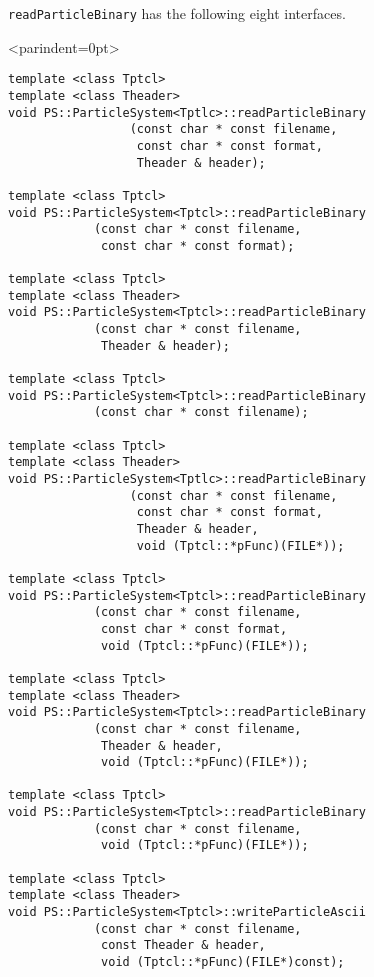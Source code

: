 \texttt{readParticleBinary} has the following eight interfaces.
\begin{breakitembox}<parindent=0pt>{}
\begin{verbatim}
template <class Tptcl>
template <class Theader>
void PS::ParticleSystem<Tptlc>::readParticleBinary
                 (const char * const filename,
                  const char * const format,
                  Theader & header);

template <class Tptcl>
void PS::ParticleSystem<Tptcl>::readParticleBinary
            (const char * const filename,
             const char * const format); 
             
template <class Tptcl>
template <class Theader>
void PS::ParticleSystem<Tptcl>::readParticleBinary
            (const char * const filename,
             Theader & header);

template <class Tptcl>
void PS::ParticleSystem<Tptcl>::readParticleBinary
            (const char * const filename);

template <class Tptcl>
template <class Theader>
void PS::ParticleSystem<Tptlc>::readParticleBinary
                 (const char * const filename,
                  const char * const format,
                  Theader & header,
                  void (Tptcl::*pFunc)(FILE*));
                 
template <class Tptcl>
void PS::ParticleSystem<Tptcl>::readParticleBinary
            (const char * const filename,
             const char * const format,
             void (Tptcl::*pFunc)(FILE*));

template <class Tptcl>
template <class Theader>
void PS::ParticleSystem<Tptcl>::readParticleBinary
            (const char * const filename,
             Theader & header,
             void (Tptcl::*pFunc)(FILE*));
             
template <class Tptcl>
void PS::ParticleSystem<Tptcl>::readParticleBinary
            (const char * const filename,
             void (Tptcl::*pFunc)(FILE*));

template <class Tptcl>
template <class Theader>
void PS::ParticleSystem<Tptcl>::writeParticleAscii
            (const char * const filename,
             const Theader & header,
             void (Tptcl::*pFunc)(FILE*)const);

\end{verbatim}
\end{breakitembox}

